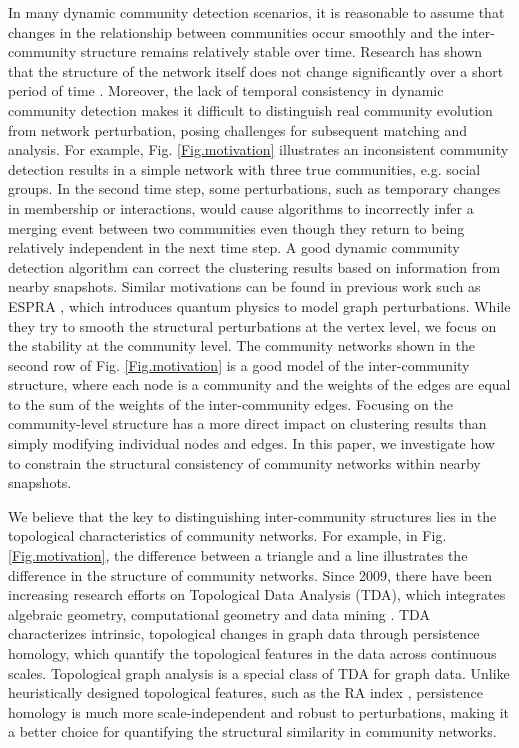 \documentclass[letterpaper]{article} %
\begin{document}
In many dynamic community detection scenarios, it is reasonable to assume that changes in the relationship between communities occur smoothly and the inter-community structure remains relatively stable over time. Research has shown that the  structure of the network itself does not change significantly over a short period of time \cite{Corne2010}.  
Moreover, the lack of temporal consistency in dynamic community detection makes it difficult to distinguish real community evolution from network perturbation, posing challenges for subsequent matching and analysis. %
For example, Fig. \ref{Fig.motivation} illustrates an inconsistent community detection results in a simple network with three true communities, e.g. social groups. In the second time step, some perturbations, such as temporary changes in membership or interactions, would cause algorithms to incorrectly infer a merging event between two communities even though they return to being relatively independent in the next time step. A good dynamic community detection algorithm can correct the clustering results based on information from nearby snapshots. %
Similar motivations can be found in previous work such as ESPRA \cite{espra}, which introduces quantum physics to model graph perturbations. While they try to smooth the structural perturbations at the vertex level, we focus on the stability at the community level. The community networks shown in the second row of Fig. \ref{Fig.motivation} is a good model of the inter-community structure, where each node is a community and the weights of the edges are equal to the sum of the weights of the inter-community edges. Focusing on the community-level structure has a more direct impact on clustering results than simply modifying individual nodes and edges. In this paper, we investigate how to constrain the structural consistency of community networks within nearby snapshots.

We believe that the key to distinguishing inter-community structures lies in the topological characteristics of community networks. For example, in Fig. \ref{Fig.motivation}, the difference between a triangle and a line illustrates the difference in the structure of community networks. %
Since 2009, there have been increasing research efforts on Topological Data Analysis (TDA), which integrates algebraic geometry, computational geometry and data mining \cite{carlsson2009topology}. TDA characterizes intrinsic, topological changes in graph data through persistence homology, which quantify the topological features in the data across continuous scales. Topological graph analysis is a special class of TDA for graph data. Unlike heuristically designed topological features, such as the RA index \cite{Zhou2009}, persistence homology is much more scale-independent and robust to perturbations, making it a better choice for quantifying the structural similarity in community networks. 
\end{document}
